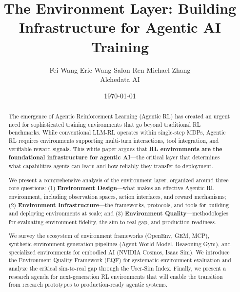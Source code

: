 \documentclass{article}
\title{\textbf{The Environment Layer: Building Infrastructure for Agentic AI Training}}
\date{\today}
\author{
  Fei Wang \quad Eric Wang \quad Salon Ren \quad Michael Zhang \\
  Alchedata AI
}
\begin{document}
\maketitle


\begin{abstract}
The emergence of Agentic Reinforcement Learning (Agentic RL) has created an urgent need for sophisticated training environments that go beyond traditional RL benchmarks. While conventional LLM-RL operates within single-step MDPs, Agentic RL requires environments supporting multi-turn interactions, tool integration, and verifiable reward signals. This white paper argues that \textbf{RL environments are the foundational infrastructure for agentic AI}---the critical layer that determines what capabilities agents can learn and how reliably they transfer to deployment.

We present a comprehensive analysis of the environment layer, organized around three core questions: (1) \textbf{Environment Design}---what makes an effective Agentic RL environment, including observation spaces, action interfaces, and reward mechanisms; (2) \textbf{Environment Infrastructure}---the frameworks, protocols, and tools for building and deploying environments at scale; and (3) \textbf{Environment Quality}---methodologies for evaluating environment fidelity, the sim-to-real gap, and production readiness.

We survey the ecosystem of environment frameworks (OpenEnv, GEM, MCP), synthetic environment generation pipelines (Agent World Model, Reasoning Gym), and specialized environments for embodied AI (NVIDIA Cosmos, Isaac Sim). We introduce the Environment Quality Framework (EQF) for systematic environment evaluation and analyze the critical sim-to-real gap through the User-Sim Index. Finally, we present a research agenda for next-generation RL environments that will enable the transition from research prototypes to production-ready agentic systems.
\end{abstract}

\tableofcontents
\newpage



\newpage
\nocite{*}


\end{document}
